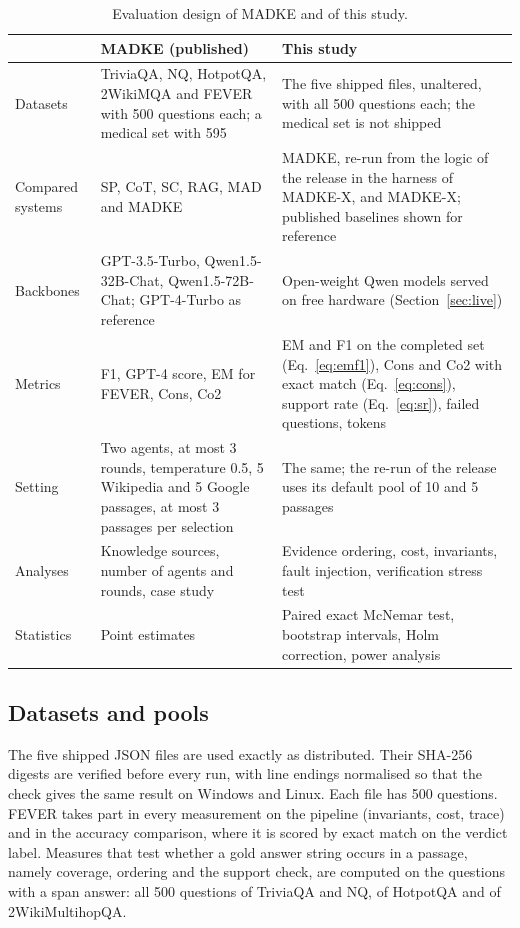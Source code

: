\begin{table}[!htbp]
\centering
\small
\caption{Evaluation design of MADKE and of this study.}
\label{tab:design}
\begin{tabular}{p{}p{}p{}}
\toprule
 & MADKE (published) & This study \\
\midrule
Datasets & TriviaQA, NQ, HotpotQA, 2WikiMQA and FEVER with 500 questions each; a medical set with 595 & The five shipped files, unaltered, with all 500 questions each; the medical set is not shipped \\
Compared systems & SP, CoT, SC, RAG, MAD and MADKE & MADKE, re-run from the logic of the release in the harness of MADKE-X, and MADKE-X; published baselines shown for reference \\
Backbones & GPT-3.5-Turbo, Qwen1.5-32B-Chat, Qwen1.5-72B-Chat; GPT-4-Turbo as reference & Open-weight Qwen models served on free hardware (Section~\ref{sec:live}) \\
Metrics & F1, GPT-4 score, EM for FEVER, Cons, Co2 & EM and F1 on the completed set (Eq.~\ref{eq:emf1}), Cons and Co2 with exact match (Eq.~\ref{eq:cons}), support rate (Eq.~\ref{eq:sr}), failed questions, tokens \\
Setting & Two agents, at most 3 rounds, temperature 0.5, 5 Wikipedia and 5 Google passages, at most 3 passages per selection & The same; the re-run of the release uses its default pool of 10 and 5 passages \\
Analyses & Knowledge sources, number of agents and rounds, case study & Evidence ordering, cost, invariants, fault injection, verification stress test \\
Statistics & Point estimates & Paired exact McNemar test, bootstrap intervals, Holm correction, power analysis \\
\bottomrule
\end{tabular}
\end{table}

\subsection{Datasets and pools}
The five shipped JSON files are used exactly as distributed. Their SHA-256 digests are verified before every run, with line endings normalised so that the check gives the same result on Windows and Linux. Each file has 500 questions. FEVER takes part in every measurement on the pipeline (invariants, cost, trace) and in the accuracy comparison, where it is scored by exact match on the verdict label. Measures that test whether a gold answer string occurs in a passage, namely coverage, ordering and the support check, are computed on the questions with a span answer: all 500 questions of TriviaQA and NQ, \VNSpanHQA{} of HotpotQA and \VNSpanWMQ{} of 2WikiMultihopQA.


